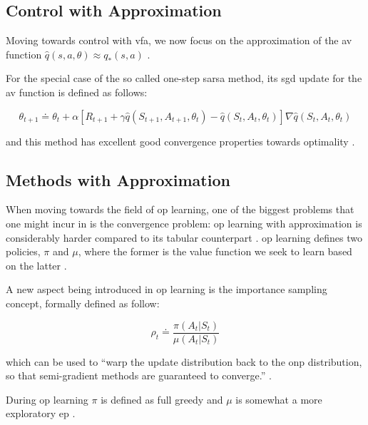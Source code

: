 \documentclass{seal_thesis}
\begin{document}
\subsection{ Control with Approximation}
\label{subsec:onpol_control}

Moving towards control with \gls{vfa}, we now focus on the approximation of the \gls{av} function $\hat{q} (s,a,\theta) \approx q_* (s,a)$ \cite[p. 229]{Sutton2017}.

For the special case of the so called one-step \gls{sarsa} method, its \gls{sgd} update for the \gls{av} function is defined as follows:

\begin{equation}
	\theta_{t+1} \doteq \theta_t + \alpha [ R_{t+1} + \gamma \hat{q} (S_{t+1}, A_{t+1}, \theta_t) - \hat{q} (S_t, A_t, \theta_t) ] \nabla \hat{q} (S_t, A_t, \theta_t)
\end{equation}

and this method has excellent good convergence properties towards optimality \cite[p. 230]{Sutton2017}.

\subsection{ Methods with Approximation}
\label{subsec:offpol_methods}

When moving towards the field of \gls{op} learning, one of the biggest problems that one might incur in is the convergence problem: \gls{op} learning with approximation is considerably harder compared to its tabular counterpart \cite[p. 243]{Sutton2017}. \gls{op} learning defines two policies, $\pi$ and $\mu$, where the former is the value function we seek to learn based on the latter \cite[p. 243]{Sutton2017}.

A new aspect being introduced in \gls{op} learning is the importance sampling concept, formally defined as follow:

\begin{equation}
\label{eq:importance_sampling}
	\rho_t \doteq \frac{\pi(A_t|S_t)}{\mu(A_t|S_t)}
\end{equation}

which can be used to ``warp the update distribution back to the \gls{onp} distribution, so that semi-gradient methods are guaranteed to converge.'' \cite[p. 243]{Sutton2017}.

During \gls{op} learning $\pi$ is defined as full greedy and $\mu$ is somewhat a more exploratory \gls{ep} \cite[p. 243]{Sutton2017}.
\end{document}

